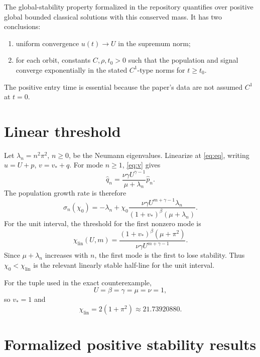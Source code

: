\documentclass[11pt]{article}
\begin{document}
The global-stability property formalized in the repository quantifies over
positive global bounded classical solutions with this conserved mass.  It
has two conclusions:
\begin{enumerate}[leftmargin=2em]
\item uniform convergence \(u(t)\to U\) in the supremum norm;
\item for each orbit, constants \(C,\rho,t_0>0\) such that the population
  and signal converge exponentially in the stated \(C^1\)-type norms for
  \(t\ge t_0\).
\end{enumerate}
The positive entry time is essential because the paper's data are not
assumed \(C^1\) at \(t=0\).

\section{Linear threshold}

Let \(\lambda_n=n^2\pi^2\), \(n\ge0\), be the Neumann eigenvalues.  Linearize
at \eqref{eq:eq}, writing \(u=U+p\), \(v=v_*+q\).  For mode \(n\ge1\),
\eqref{eq:v} gives
\[
  \widehat q_n
   =\frac{\nu\gamma U^{\gamma-1}}{\mu+\lambda_n}
      \widehat p_n.
\]
The population growth rate is therefore
\begin{equation}
 \sigma_n(\chi_0)
 =-\lambda_n+
 \chi_0
 \frac{\nu\gamma U^{m+\gamma-1}\lambda_n}
 {(1+v_*)^\beta(\mu+\lambda_n)}.                        \label{eq:sigma}
\end{equation}
For the unit interval, the threshold for the first nonzero mode is
\begin{equation}
 \chi_{\mathrm{lin}}(U,m)
 =\frac{(1+v_*)^\beta(\mu+\pi^2)}
        {\nu\gamma U^{m+\gamma-1}}.                     \label{eq:chilin}
\end{equation}
Since \(\mu+\lambda_n\) increases with \(n\), the first mode is the first to
lose stability.  Thus \(\chi_0<\chi_{\mathrm{lin}}\) is the relevant
linearly stable half-line for the unit interval.

For the tuple used in the exact counterexample,
\[
 U=\beta=\gamma=\mu=\nu=1,
\]
so \(v_*=1\) and
\begin{equation}
  \chi_{\mathrm{lin}}=2(1+\pi^2)\approx21.73920880.
  \label{eq:fixed-chilin}
\end{equation}

\section{Formalized positive stability results}
\end{document}
